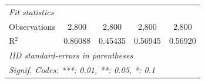 \begin{table}[H]
\begin{tabular}{lcccc}
      \midrule
      \emph{Fit statistics}\\
      Observations      & 2,800          & 2,800          & 2,800          & 2,800\\  
      R$^2$             & 0.86088        & 0.45435        & 0.56945        & 0.56920\\  
      \midrule \midrule
      \multicolumn{5}{l}{\emph{IID standard-errors in parentheses}}\\
      \multicolumn{5}{l}{\emph{Signif. Codes: ***: 0.01, **: 0.05, *: 0.1}}\\
   \end{tabular}
\end{table}


